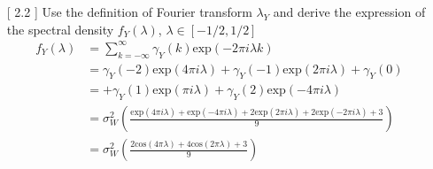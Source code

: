 \documentclass[10pt,a4paper]{article}
\begin{document}
\begin{enumerate}
\begin{enumerate}
		\item[[ 2.2]] Use the definition of Fourier transform $\lambda_Y$ and derive the expression of the spectral density $f_Y(\lambda)$, $\lambda \in \left[-1/2,1/2\right]$
		\begin{align*}
			f_Y(\lambda) &= \sum_{k=-\infty}^{\infty} \gamma_{Y}(k) \text{exp}(-2\pi i \lambda k) \\
			&= \gamma_Y(-2) \text{exp}(4\pi i \lambda) + \gamma_Y(-1) \text{exp}(2\pi i \lambda) + \gamma_Y(0) \\
			&= + \gamma_Y(1) \text{exp}(\pi i \lambda) + \gamma_Y(2) \text{exp}(-4\pi i \lambda) \\
			&= \sigma_{W}^2 \left( \frac{\text{exp}(4\pi i \lambda) + \text{exp}(-4\pi i \lambda) + 2 \text{exp}(2\pi i \lambda) + 2 \text{exp}(-2\pi i \lambda) + 3 }{9}\right) \\
			&= \sigma_{W}^2 \left( \frac{2 \text{cos}(4\pi \lambda) + 4 \text{cos}(2\pi \lambda) + 3 }{9}\right)
		\end{align*}
		
		\end{enumerate}
	

\end{enumerate}
\end{document}
